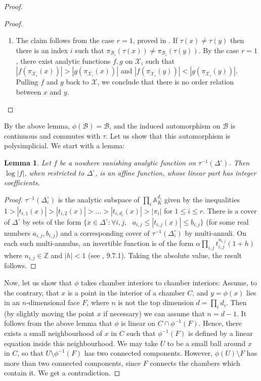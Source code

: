 \documentclass{amsart}
\theoremstyle{theorem}
\theoremstyle{lemma}
\newtheorem{lemma}{Lemma}[section]
\theoremstyle{prop}
\theoremstyle{definition}
\theoremstyle{corollary}
\theoremstyle{remark}
\newcommand{\A}{\mathbb{A}}
\newcommand{\Z}{\mathbb{Z}}
\newcommand{\B}{\mathcal{B}}
\newcommand{\X}{\mathcal{X}}
\begin{document}
\begin{proof}
\begin{proof}
\begin{enumerate}
\item
The claim follows from the case $r=1$, proved in \cite{ber}. If $\tau(x) \neq \tau(y)$ then there is an index $i$ such that $\pi_{\B_i}(\tau(x)) \neq \pi_{\B_i}(\tau(y))$. By the case $r=1$, there exist analytic functions $f,g$ on $\X_i$ such that $|f(\pi_{\X_i}(x))| > |g(\pi_{\X_i}(x))|$ and  $|f(\pi_{\X_i}(y))| < |g(\pi_{\X_i}(y))|$. Pulling $f$ and $g$ back to $\X$, we conclude that there is no order relation between $x$ and $y$. \qedhere
\end{enumerate}
\end{proof}

By the above lemma, $\phi(\B)=\B$, and the induced automorphism on $\mathcal{B}$ is continuous and commutes with $\tau$. Let us show that this automorphism is polysimplicial. We start with a lemma:

\begin{lemma} \label{affine}
Let $f$ be a nowhere vanishing analytic function on $\tau^{-1}(\Delta^\circ)$. Then $\log |f|$, when restricted to $\Delta^\circ$, is an affine function, whose linear part has integer coefficients. 
\end{lemma} \begin{proof}
$\tau^{-1}(\Delta_i^\circ)$ is the analytic subspace of $\prod_i  \A^{d_i}_K$ given by the inequalities $ 1 > |t_{i,1}(x)| > |t_{i,2}(x)| > ... > |t_{i,d_i}(x)| > |\pi_i|$ for $1 \leq i \leq r$.
There is a cover of $\Delta^{\circ}$ by sets of the form $\{ x\in \Delta^\circ: \forall i,j,\text{ } a_{i,j} \leq |t_{i,j}(x)| \leq b_{i,j}\}$ (for some real numbers $a_{i,j},b_{i,j}$) and a corresponding cover of $\tau^{-1}(\Delta_i^\circ)$ by multi-annuli. 
On each such multi-annulus, an invertible function is of the form $\alpha \prod_{i,j}t_{i,j}^{n_{i,j}}(1+h)$ where $n_{i,j}\in \Z$ and $|h|<1$ (see \cite{bgr}, 9.7.1). Taking the absolute value, the result follows.
\end{proof}

 Now, let us show that $\phi$ takes chamber interiors to chamber interiors: Assume, to the contrary, that $x$ is a point in the interior of a chamber $C$, and $y=\phi(x)$ lies in an $n$-dimensional face $F$, where $n$ is not the top dimension $d=\prod_i d_i$. Then (by slightly moving the point $x$ if necessary) we can assume that $n=d-1$. It follows from the above lemma that $\phi$ is linear on $C \cap \phi^{-1}(F)$. Hence, there exists a small neighbourhood of $x$ in $C$ such that $\phi^{-1}(F)$ is defined by a linear equation inside this neighbourhood. We may take $U$ to be a small ball around $x$ in $C$, so that $U \setminus \phi^{-1}(F)$ has two connected components. However, $\phi(U)\setminus F$ has more than two connected components, since $F$ connects the chambers which contain it. We get a contradiction. 


\end{proof}
\end{document}
